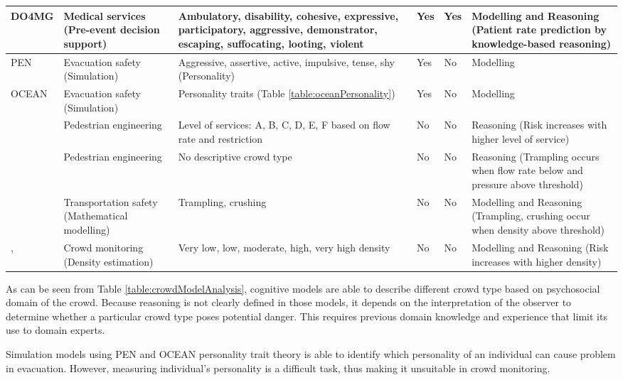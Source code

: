 \begin{center}
\begin{longtable}{|p{2cm}|p{2cm}|p{4cm}|p{1.5cm}|p{1.5cm}|p{2cm}|}
	\hline
	DO4MG \citep{DelirHaghighi2013a} & Medical services (Pre-event decision support) & Ambulatory, disability, cohesive, expressive, participatory, aggressive, demonstrator, escaping, suffocating, looting, violent & Yes & Yes & Modelling and Reasoning (Patient rate prediction by knowledge-based reasoning) \\
	\hline
	PEN \citep{Guy2011} & Evacuation safety (Simulation) & Aggressive, assertive, active, impulsive, tense, shy (Personality) & Yes & No & Modelling \\
	\hline
	OCEAN \citep{Durupinar2008} & Evacuation safety (Simulation) & Personality traits (Table \ref{table:oceanPersonality}) & Yes & No & Modelling \\
	\hline
	\citet{Fruin1970} & Pedestrian engineering & Level of services: A, B, C, D, E, F based on flow rate and restriction & No & No & Reasoning (Risk increases with higher level of service) \\
	\hline
	\citet{Helbing2007} & Pedestrian engineering & No descriptive crowd type & No & No & Reasoning (Trampling occurs when flow rate below and pressure above threshold) \\
	\hline
	\citet{Lee2005} & Transportation safety (Mathematical modelling) & Trampling, crushing & No & No & Modelling and Reasoning (Trampling, crushing occur when density above threshold) \\
	\hline
	\citet{Marana1997} , \citet{Weppner2011} & Crowd monitoring (Density estimation) & Very low, low, moderate, high, very high density & No & No & Modelling and Reasoning (Risk increases with higher density) \\
	\hline
	\end{longtable}
\end{center}
As can be seen from Table \ref{table:crowdModelAnalysis}, cognitive models \citep{Blumer1951,Lofland1985,Momboisse1967} are able to describe different crowd type based on psychosocial domain of the crowd. Because reasoning is not clearly defined in those models, it depends on the interpretation of the observer to determine whether a particular crowd type poses potential danger. This requires previous domain knowledge and experience that limit its use to domain experts.

Simulation models using PEN \citep{Guy2011} and OCEAN \citep{Durupinar2008} personality trait theory is able to identify which personality of an individual can cause problem in evacuation. However, measuring individual’s personality is a difficult task, thus making it unsuitable in crowd monitoring.

